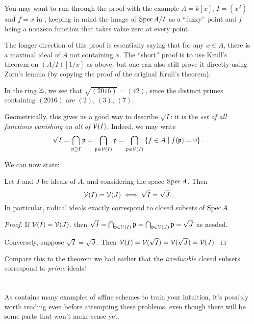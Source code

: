 You may want to run through the proof with the example $A = k[x]$, $I = (x^2)$ and $f = x$
in ,
keeping in mind the image of $\operatorname{Spec} A/I$ as a ``fuzzy'' point and $f$ being a nonzero function that
takes value zero at every point.

\begin{remark}
	The longer direction of this proof is essentially
	saying that for any $x \in A$,
	there is a maximal ideal of $A$ not containing $x$.
	The ``short'' proof is to use Krull's theorem on $(A/I)[1/x]$ as above,
	but one can also still prove it directly using Zorn's lemma
	(by copying the proof of the original Krull's theorem).
\end{remark}

\begin{example}
	[$\sqrt{(2016)} = (42)$ in $\ZZ$]
	In the ring $\ZZ$, we see that $\sqrt{(2016)} = (42)$,
	since the distinct primes containing $(2016)$
	are $(2)$, $(3)$, $(7)$.
\end{example}

Geometrically, this gives us a good way to describe $\sqrt I$:
it is the \emph{set of all functions vanishing on all of $\mathcal V(I)$}.
Indeed, we may write
\[ \sqrt I = \bigcap_{\mathfrak p \supseteq I} \mathfrak p
	= \bigcap_{\mathfrak p \in \mathcal V(I)} \mathfrak p
	= \bigcap_{\mathfrak p \in \mathcal V(I)} \left\{ f \in A \mid f(\mathfrak p) = 0 \right\}. \]

We can now state:
\begin{theorem}
	Let $I$ and $J$ be ideals of $A$,
	and considering the space $\operatorname{Spec} A$.
	Then
	\[ \mathcal V(I) = \mathcal V(J) \iff \sqrt I = \sqrt J. \]
	In particular, radical ideals exactly
	correspond to closed subsets of $\operatorname{Spec} A$.
\end{theorem}
\begin{proof}
	If $\mathcal V(I) = \mathcal V(J)$,
	then $\sqrt I = \bigcap_{\mathfrak p \in \mathcal V(I)} \mathfrak p =
	\bigcap_{\mathfrak p \in \mathcal V(J)} \mathfrak p = \sqrt J$ as needed.

	Conversely, suppose $\sqrt I = \sqrt J$.
	Then $\mathcal V(I) = \mathcal V(\sqrt I) = \mathcal V(\sqrt J) = \mathcal V(J)$.
\end{proof}

Compare this to the theorem we had earlier
that the \emph{irreducible} closed subsets correspond to \emph{prime} ideals!

\section{\problemhead}
As  contains many
examples of affine schemes to train your intuition,
it's possibly worth reading even before attempting these problems,
even though there will be some parts that won't make sense yet.

